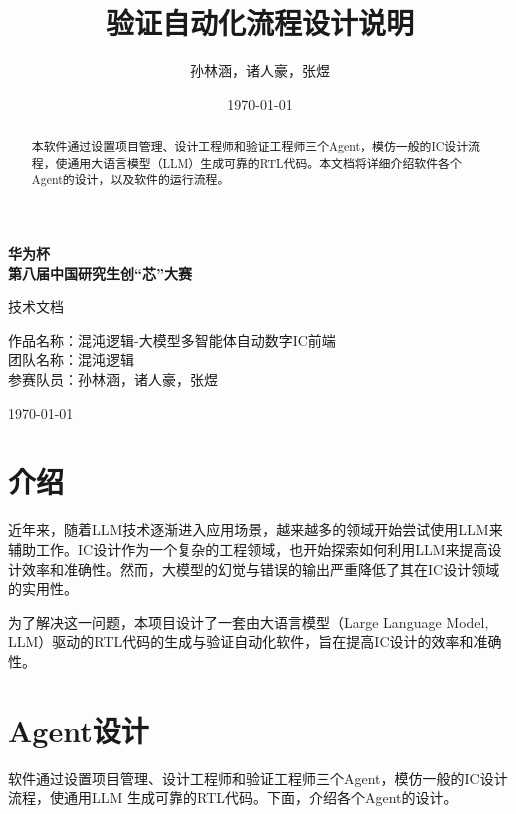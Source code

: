 \documentclass[UTF8]{ctexart}
\title{验证自动化流程设计说明}
\author{孙林涵，诸人豪，张煜}
\date{\today}
\begin{document}
\begin{titlepage}
    \centering
    \vspace*{3cm}
    
    {\Huge \bfseries 华为杯\\[1em]
    第八届中国研究生创“芯”大赛\\[3em]}
    
    {\LARGE 技术文档\\[5em]}
    
    {\Large
    作品名称：混沌逻辑-大模型多智能体自动数字IC前端\hspace{6cm} \\[2em]
    团队名称：混沌逻辑\hspace{6cm} \\[2em]
    参赛队员：孙林涵，诸人豪，张煜\hspace{6cm} \\[5em]
    }
    
    \vfill
    {\large \today}
\end{titlepage}

\begin{abstract}
本软件通过设置项目管理、设计工程师和验证工程师三个Agent，模仿一般的IC设计流程，使通用大语言模型（LLM）生成可靠的RTL代码。本文档将详细介绍软件各个Agent的设计，以及软件的运行流程。
\end{abstract}

\tableofcontents
\newpage

\section{介绍}
近年来，随着LLM技术逐渐进入应用场景，越来越多的领域开始尝试使用LLM来辅助工作。IC设计作为一个复杂的工程领域，也开始探索如何利用LLM来提高设计效率和准确性。然而，大模型的幻觉与错误的输出严重降低了其在IC设计领域的实用性。

为了解决这一问题，本项目设计了一套由大语言模型（Large Language Model, LLM）驱动的RTL代码的生成与验证自动化软件，旨在提高IC设计的效率和准确性。

\section{Agent设计}
软件通过设置项目管理、设计工程师和验证工程师三个Agent，模仿一般的IC设计流程，使通用LLM
生成可靠的RTL代码。下面，介绍各个Agent的设计。
\end{document}
